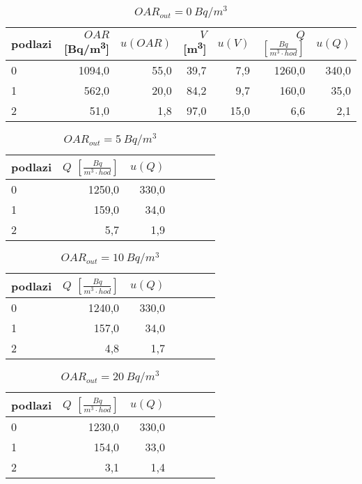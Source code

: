 \begin{table}[ht]
    \centering
    \caption{$OAR_{out}=\SI{0}{Bq/m^3}$}
    \begin{tabular}{lrrrrrr}
        \toprule
        podlazi & $OAR$ [\si{Bq/m^3}] & $u(OAR)$ & $V$ [\si{m^3}] & $u(V)$ & $Q$ $\left[\si{\frac{Bq}{m^3\cdot hod}}\right]$ & $u(Q)$ \\
        \midrule
        0 &              1094,0 &     55,0 &           39,7 &    7,9 &                                          1260,0 &  340,0 \\
        1 &               562,0 &     20,0 &           84,2 &    9,7 &                                           160,0 &   35,0 \\
        2 &                51,0 &      1,8 &           97,0 &   15,0 &                                             6,6 &    2,1 \\
        \bottomrule
    \end{tabular}
\end{table}

\begin{table}[ht]
    \centering
    \caption{$OAR_{out}=\SI{5}{Bq/m^3}$}
\begin{tabular}{lrrrrrr}
\toprule
podlazi  & $Q$ $\left[\si{\frac{Bq}{m^3\cdot hod}}\right]$ & $u(Q)$ \\
\midrule
0 &                1250,0 &  330,0 \\
1 &                 159,0 &   34,0 \\
2 &                   5,7 &    1,9 \\
\bottomrule
\end{tabular}
\end{table}

\begin{table}[ht]
    \centering
    \caption{$OAR_{out}=\SI{10}{Bq/m^3}$}
\begin{tabular}{lrrrrrr}
\toprule
podlazi  & $Q$ $\left[\si{\frac{Bq}{m^3\cdot hod}}\right]$ & $u(Q)$ \\
\midrule
0 &                                      1240,0 &  330,0 \\
1 &                                       157,0 &   34,0 \\
2 &                                         4,8 &    1,7 \\
\bottomrule
\end{tabular}
\end{table}

\begin{table}[ht]
    \centering
    \caption{$OAR_{out}=\SI{20}{Bq/m^3}$}
\begin{tabular}{lrrrrrr}
\toprule
podlazi & $Q$ $\left[\si{\frac{Bq}{m^3\cdot hod}}\right]$ & $u(Q)$ \\
\midrule
0 &                                1230,0 &  330,0 \\
1 &                                 154,0 &   33,0 \\
2 &                                   3,1 &    1,4 \\
\bottomrule
\end{tabular}
\end{table}

